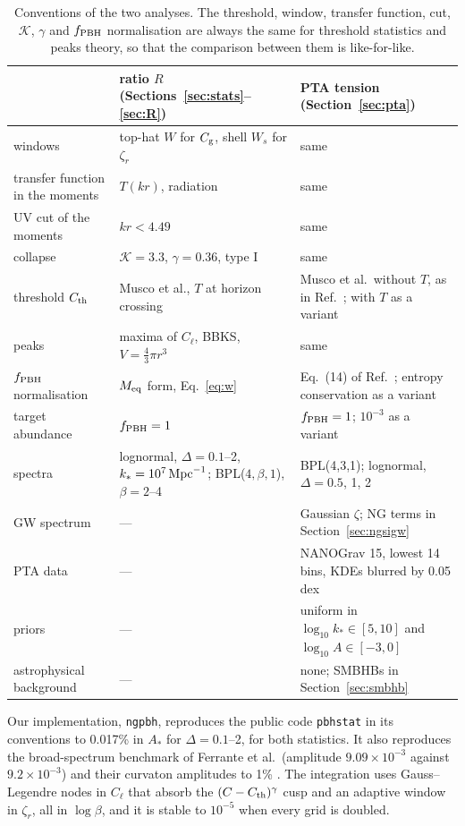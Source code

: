 \documentclass{article}
\newcommand{\Cg}{C_{\rm g}}
\newcommand{\Cl}{C_{\ell}}
\newcommand{\zr}{\zeta_r}
\newcommand{\fpbh}{f_{\rm PBH}}
\begin{document}
\begin{table}[t]
\caption{Conventions of the two analyses. The threshold, window, transfer function, cut,
$\mathcal K$, $\gamma$ and $\fpbh$ normalisation are always the same for threshold statistics and
peaks theory, so that the comparison between them is like-for-like.}
\label{tab:conv}
\centering\small
\begin{tabular}{@{}>{\raggedright\arraybackslash}p{3.2cm}>{\raggedright\arraybackslash}p{5.4cm}>{\raggedright\arraybackslash}p{6.0cm}@{}}
\toprule
 & ratio $R$ (Sections~\ref{sec:stats}--\ref{sec:R}) & PTA tension (Section~\ref{sec:pta})\\
\midrule
windows & top-hat $W$ for $\Cg$, shell $W_s$ for $\zr$ & same\\
transfer function in the moments & $T(kr)$, radiation & same\\
UV cut of the moments & $kr<4.49$ & same\\
collapse & $\mathcal K=3.3$, $\gamma=0.36$, type I & same\\
threshold $C_{\rm th}$ & Musco et al., $T$ at horizon crossing & Musco et al.\ without $T$, as in
Ref.~\cite{FIVT23}; with $T$ as a variant\\
peaks & maxima of $\Cl$, BBKS, $V=\frac43\pi r^3$ & same\\
$\fpbh$ normalisation & $M_{\rm eq}$ form, Eq.~\eqref{eq:w} & Eq.~(14) of Ref.~\cite{FIVT23}; entropy
conservation as a variant\\
target abundance & $\fpbh=1$ & $\fpbh=1$; $10^{-3}$ as a variant\\
spectra & lognormal, $\Delta=0.1$--2, $k_*=10^7\,{\rm Mpc}^{-1}$; BPL($4,\beta,1$), $\beta=2$--4 &
BPL(4,3,1); lognormal, $\Delta=0.5$, 1, 2\\
GW spectrum & --- & Gaussian $\zeta$; NG terms in Section~\ref{sec:ngsigw}\\
PTA data & --- & NANOGrav 15, lowest 14 bins, KDEs blurred by 0.05 dex\\
priors & --- & uniform in $\log_{10}k_*\in[5,10]$ and $\log_{10}A\in[-3,0]$\\
astrophysical background & --- & none; SMBHBs in Section~\ref{sec:smbhb}\\
\bottomrule
\end{tabular}
\end{table}

Our implementation, \texttt{ngpbh}, reproduces the public code \texttt{pbhstat}
\cite{ColeFumagalli} in its conventions to 0.017\% in $A_*$ for $\Delta=0.1$--2, for both
statistics. It also reproduces the broad-spectrum benchmark of Ferrante et al.\ (amplitude
$9.09\times10^{-3}$ against $9.2\times10^{-3}$) and their curvaton amplitudes to 1\%
\cite{Ferrante}. The integration uses Gauss--Legendre nodes in $\Cl$ that absorb the
$(C-C_{\rm th})^\gamma$ cusp and an adaptive window in $\zr$, all in $\log\beta$, and it is stable
to $10^{-5}$ when every grid is doubled.
\end{document}
